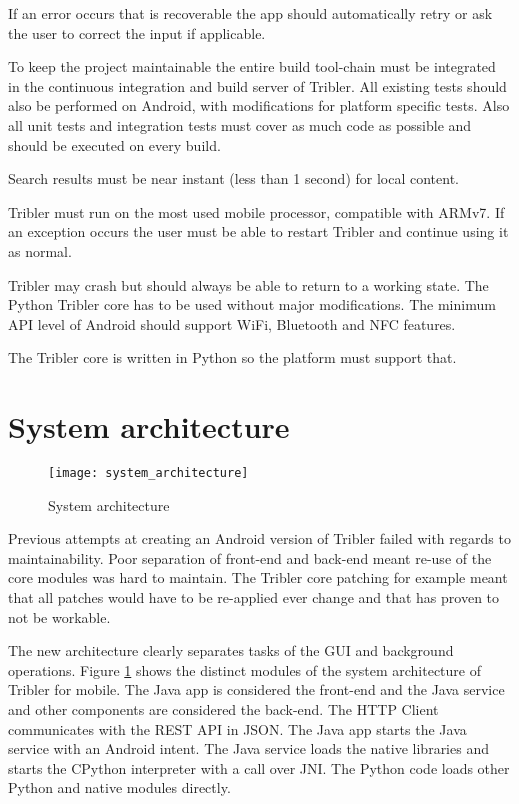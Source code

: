 If an error occurs that is recoverable the app should automatically retry or ask the user to correct the input if applicable.

To keep the project maintainable the entire build tool-chain must be integrated in the continuous integration and build server of Tribler.
All existing tests should also be performed on Android, with modifications for platform specific tests.
Also all unit tests and integration tests must cover as much code as possible and should be executed on every build.



Search results must be near instant (less than 1 second) for local content.

Tribler must run on the most used mobile processor, compatible with ARMv7.
If an exception occurs the user must be able to restart Tribler and continue using it as normal.

Tribler may crash but should always be able to return to a working state.
The Python Tribler core has to be used without major modifications.
The minimum API level of Android should support WiFi, Bluetooth and NFC features.

The Tribler core is written in Python so the platform must support that.



\section{System architecture}

\begin{figure}
	\centering
	\texttt{[image: system\_architecture]}
	\caption{System architecture}
	\label{fig:system_architecture}
\end{figure}

Previous attempts at creating an Android version of Tribler failed with regards to maintainability.
Poor separation of front-end and back-end meant re-use of the core modules was hard to maintain.
The Tribler core patching for example meant that all patches would have to be re-applied ever change and that has proven to not be workable.

The new architecture clearly separates tasks of the GUI and background operations.
Figure \ref{fig:system_architecture} shows the distinct modules of the system architecture of Tribler for mobile.
The Java app is considered the front-end and the Java service and other components are considered the back-end.
The HTTP Client communicates with the REST API in JSON.
The Java app starts the Java service with an Android intent.
The Java service loads the native libraries and starts the CPython interpreter with a call over JNI.
The Python code loads other Python and native modules directly.


